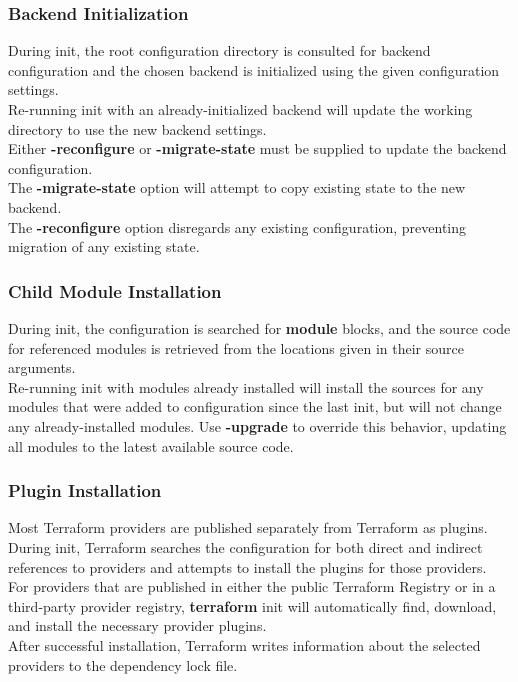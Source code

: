 \documentclass[12pt, letterpaper, twoside]{article}
\begin{document}
\subsubsection{Backend Initialization}
During init, the root configuration directory is consulted for backend configuration 
and the chosen backend is initialized using the given configuration settings.\\
Re-running init with an already-initialized backend will update the working directory 
to use the new backend settings.\\
Either \textbf{-reconfigure} or \textbf{-migrate-state }must be supplied to update the backend configuration.\\
The \textbf{-migrate-state} option will attempt to copy existing state to the new backend.\\
The \textbf{-reconfigure} option disregards any existing configuration, preventing migration 
of any existing state.\\

\subsubsection{Child Module Installation}
During init, the configuration is searched for \textbf{module} blocks, and the source 
code for referenced modules is retrieved from the locations given in their source arguments.\\
Re-running init with modules already installed will install the sources for any modules 
that were added to configuration since the last init, but will not change any already-installed 
modules. Use \textbf{-upgrade} to override this behavior, updating all modules to 
the latest available source code.\\

\subsubsection{Plugin Installation}
Most Terraform providers are published separately from Terraform as plugins. 
During init, Terraform searches the configuration for both direct and indirect references 
to providers and attempts to install the plugins for those providers.\\
For providers that are published in either the public Terraform Registry or in a 
third-party provider registry, \textbf{terraform} init will automatically find, 
download, and install the necessary provider plugins.\\
After successful installation, Terraform writes information about the selected providers 
to the dependency lock file.
\end{document}
